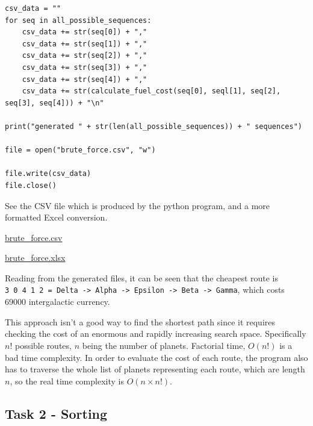 \documentclass[
]{article}
\begin{document}
\begin{verbatim}
csv_data = ""
for seq in all_possible_sequences:
    csv_data += str(seq[0]) + ","
    csv_data += str(seq[1]) + ","
    csv_data += str(seq[2]) + ","
    csv_data += str(seq[3]) + ","
    csv_data += str(seq[4]) + ","
    csv_data += str(calculate_fuel_cost(seq[0], seql[1], seq[2], seq[3], seq[4])) + "\n"

print("generated " + str(len(all_possible_sequences)) + " sequences")

file = open("brute_force.csv", "w")

file.write(csv_data)
file.close()
\end{verbatim}

See the CSV file which is produced by the python program, and a more
formatted Excel conversion.

\url{brute_force.csv}

\url{brute_force.xlsx}

Reading from the generated files, it can be seen that the cheapest route
is
\texttt{3\ 0\ 4\ 1\ 2\ =\ Delta\ -\textgreater{}\ Alpha\ -\textgreater{}\ Epsilon\ -\textgreater{}\ Beta\ -\textgreater{}\ Gamma},
which costs 69000 intergalactic currency.

This approach isn't a good way to find the shortest path since it
requires checking the cost of an enormous and rapidly increasing search
space. Specifically \(n!\) possible routes, \(n\) being the number of
planets. Factorial time, \(O(n!)\) is a bad time complexity. In order to
evaluate the cost of each route, the program also has to traverse the
whole list of planets representing each route, which are length \(n\),
so the real time complexity is \(O(n\times n!)\).

\subsection{Task 2 - Sorting}\label{task-2---sorting}
\end{document}
